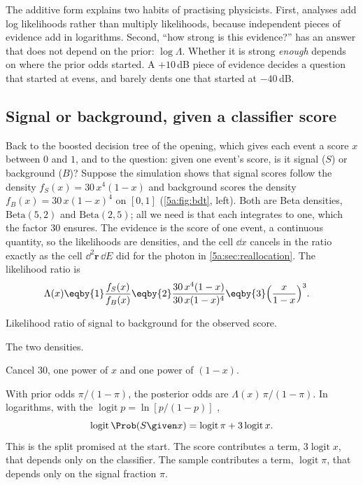 The additive form explains two habits of practising physicists. First, analyses
add log likelihoods rather than multiply likelihoods, because independent pieces of
evidence add in logarithms. Second, ``how strong is this evidence?'' has an answer
that does not depend on the prior: $\log\Lambda$. Whether it is strong \emph{enough} depends on where the
prior odds started. A $+10\,$dB piece of evidence decides a question that started at
evens, and barely dents one that started at $-40\,$dB.

\subsection{Signal or background, given a classifier score}

Back to the boosted decision tree of the opening, which gives each event a score
$x$ between $0$ and $1$, and to the question: given one event's score, is it
signal ($S$) or background ($B$)? Suppose the simulation shows that signal scores follow the
density $f_S(x)=30\,x^4(1-x)$ and background scores the density
$f_B(x)=30\,x(1-x)^4$ on $[0,1]$ (\cref{5a:fig:bdt}, left). Both are Beta densities,
$\mathrm{Beta}(5,2)$ and $\mathrm{Beta}(2,5)$; all we need is that each integrates to
one, which the factor $30$ ensures. The evidence is the score of one event, a
continuous quantity, so the likelihoods are densities, and the cell $\dd x$ cancels in
the ratio exactly as the cell $\dd^2\bm r\,\dd E$ did for the photon in
\cref{5a:sec:reallocation}. The likelihood ratio is
\begin{align}
  \Lambda(x)
  &\eqby{1}\frac{f_S(x)}{f_B(x)}
  \eqby{2}\frac{30\,x^4(1-x)}{30\,x(1-x)^4}
  \eqby{3}\Bigl(\frac{x}{1-x}\Bigr)^{3} .
  \label{5a:eq:bdt-lr}
\end{align}
\begin{explain}
  \item Likelihood ratio of signal to background for the observed score.
  \item The two densities.
  \item Cancel $30$, one power of $x$ and one power of $(1-x)$.
\end{explain}
With prior odds $\pi/(1-\pi)$, the posterior odds are
$\Lambda(x)\,\pi/(1-\pi)$. In logarithms, with the 
$\operatorname{logit}p=\ln[p/(1-p)]$ ,
\begin{equation}
  \operatorname{logit}\Prob(S\given x)=\operatorname{logit}\pi+3\operatorname{logit}x .
  \label{5a:eq:bdt-logit}
\end{equation}
This is the split promised at the start. The score contributes a term,
$3\operatorname{logit}x$, that depends only on the classifier. The sample
contributes a term, $\operatorname{logit}\pi$, that depends only on the signal
fraction $\pi$.

